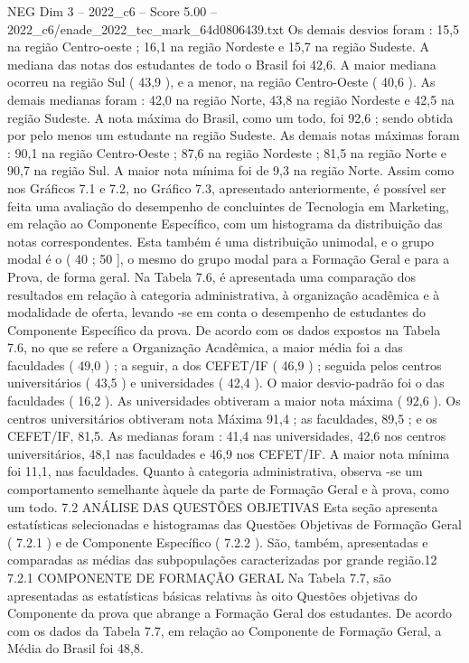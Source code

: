 \begin{textsample}{NEG Dim 3 – 2022\_c6 – Score 5.00 – 2022\_c6/enade\_2022\_tec\_mark\_64d0806439.txt}
Os demais desvios foram : 15,5 na região Centro-oeste ; 16,1 na região Nordeste e 15,7 na região Sudeste.
A mediana das notas dos estudantes de todo o Brasil foi 42,6.
A maior mediana ocorreu na região Sul ( 43,9 ), e a menor, na região Centro-Oeste ( 40,6 ).
As demais medianas foram : 42,0 na região Norte, 43,8 na região Nordeste e 42,5 na região Sudeste.
A nota máxima do Brasil, como um todo, foi 92,6 ; sendo obtida por pelo menos um estudante na região Sudeste.
As demais notas máximas foram : 90,1 na região Centro-Oeste ; 87,6 na região Nordeste ; 81,5 na região Norte e 90,7 na região Sul.
A maior nota mínima foi de 9,3 na região Norte.
Assim como nos Gráficos 7.1 e 7.2, no Gráfico 7.3, apresentado anteriormente, é possível ser feita uma avaliação do desempenho de concluintes de Tecnologia em Marketing, em relação ao Componente Específico, com um histograma da distribuição das notas correspondentes.
Esta também é uma distribuição unimodal, e o grupo modal é o ( 40 ; 50 ], o mesmo do grupo modal para a Formação Geral e para a Prova, de forma geral.
Na Tabela 7.6, é apresentada uma comparação dos resultados em relação à categoria administrativa, à organização acadêmica e à modalidade de oferta, levando -se em conta o desempenho de estudantes do Componente Específico da prova.
De acordo com os dados expostos na Tabela 7.6, no que se refere a Organização Acadêmica, a maior média foi a das faculdades ( 49,0 ) ; a seguir, a dos CEFET/IF ( 46,9 ) ; seguida pelos centros universitários ( 43,5 ) e universidades ( 42,4 ).
O maior desvio-padrão foi o das faculdades ( 16,2 ).
As universidades obtiveram a maior nota máxima ( 92,6 ).
Os centros universitários obtiveram nota Máxima 91,4 ; as faculdades, 89,5 ; e os CEFET/IF, 81,5.
As medianas foram : 41,4 nas universidades, 42,6 nos centros universitários, 48,1 nas faculdades e 46,9 nos CEFET/IF.
A maior nota mínima foi 11,1, nas faculdades.
Quanto à categoria administrativa, observa -se um comportamento semelhante àquele da parte de Formação Geral e à prova, como um todo. 7.2 ANÁLISE DAS QUESTÕES OBJETIVAS Esta seção apresenta estatísticas selecionadas e histogramas das Questões Objetivas de Formação Geral ( 7.2.1 ) e de Componente Específico ( 7.2.2 ).
São, também, apresentadas e comparadas as médias das subpopulações caracterizadas por grande região.12 7.2.1 COMPONENTE DE FORMAÇÃO GERAL Na Tabela 7.7, são apresentadas as estatísticas básicas relativas às oito Questões objetivas do Componente da prova que abrange a Formação Geral dos estudantes.
De acordo com os dados da Tabela 7.7, em relação ao Componente de Formação Geral, a Média do Brasil foi 48,8.

\end{textsample}

